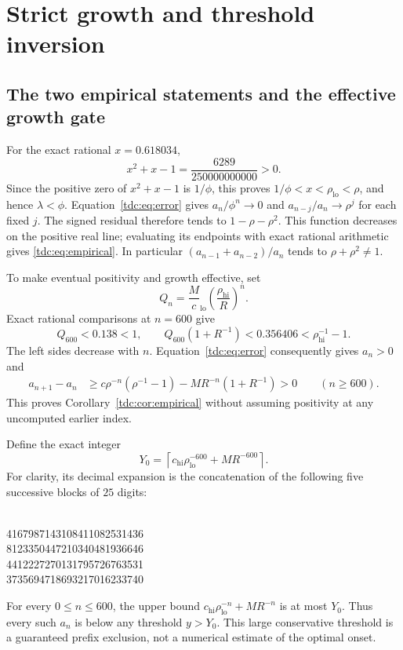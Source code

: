 \documentclass[11pt]{article}
\theoremstyle{definition}\newtheorem{definition}[theorem]{Definition}
\theoremstyle{remark}\newtheorem{remark}[theorem]{Remark}
\newcommand{\rhol}{\rho_{\mathrm{lo}}}
\newcommand{\rhoh}{\rho_{\mathrm{hi}}}
\newcommand{\cl}{c_{\mathrm{lo}}}
\newcommand{\ch}{c_{\mathrm{hi}}}
\begin{document}
\section{Strict growth and threshold inversion}
\label{tdc:sec:inverse}
\subsection{The two empirical statements and the effective growth gate}
For the exact rational $x=0.618034$,
\[
 x^2+x-1=\frac{6289}{250000000000}>0.
\]
Since the positive zero of $x^2+x-1$ is $1/\phi$, this proves
$1/\phi<x<\rhol<\rho$, and hence $\lambda<\phi$. Equation~\eqref{tdc:eq:error} gives $a_n/\phi^n\to0$ and
$a_{n-j}/a_n\to\rho^j$ for each fixed $j$. The signed residual therefore tends to $1-\rho-\rho^2$. This function decreases on the positive real line; evaluating its endpoints with exact rational arithmetic gives \eqref{tdc:eq:empirical}. In particular $(a_{n-1}+a_{n-2})/a_n$ tends to $\rho+\rho^2\ne1$.

To make eventual positivity and growth effective, set
\[
 Q_n=\frac M\cl\left(\frac{\rhoh}{R}\right)^n.
\]
Exact rational comparisons at $n=600$ give
\begin{equation}\label{tdc:eq:growthgate}
 Q_{600}<0.138<1,\qquad
 Q_{600}(1+R^{-1})<0.356406<\rhoh^{-1}-1.
\end{equation}
The left sides decrease with $n$. Equation~\eqref{tdc:eq:error} consequently gives $a_n>0$ and
\begin{align*}
 a_{n+1}-a_n
 &\ge c\rho^{-n}(\rho^{-1}-1)-MR^{-n}(1+R^{-1})>0
 \qquad(n\ge600).
\end{align*}
This proves Corollary~\ref{tdc:cor:empirical} without assuming positivity at any uncomputed earlier index.

Define the exact integer
\begin{equation}\label{tdc:eq:Y0}
 Y_0=\left\lceil\ch\rhol^{-600}+MR^{-600}\right\rceil.
\end{equation}
For clarity, its decimal expansion is the concatenation of the following five successive blocks of $25$ digits:
\begin{center}\\
4167987143108411082531436\\
8123350447210340481936646\\
4412227270131795726763531\\
3735694718693217016233740
\end{center}
For every $0\le n\le600$, the upper bound
$\ch\rhol^{-n}+MR^{-n}$ is at most $Y_0$. Thus every such $a_n$ is below any threshold $y>Y_0$. This large conservative threshold is a guaranteed prefix exclusion, not a numerical estimate of the optimal onset.
\end{document}
